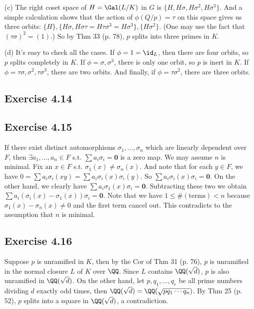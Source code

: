 \documentclass[../Chapter.tex]{subfiles}
\begin{document}
(c) The right coset space of $H=\Gal(L/K)$ in $G$ is $\{H,H\sigma,H\sigma^2,H\sigma^3\}$. And a simple calculation shows that the action of $\phi(Q/p)=\tau$ on this space gives us three orbits: $\{H\},\{H\sigma,H\sigma\tau=H\tau\sigma^3=H\sigma^3\},\{H\sigma^2\}$. (One may use the fact that $(\tau\sigma)^2=(1)$.) So by Thm 33 (p. 78), $p$ splits into three primes in $K$.

(d) It's easy to check all the cases. If $\phi=1=\id_L$, then there are four orbits, so $p$ splits completely in $K$. If $\phi=\sigma,\sigma^3$, there is only one orbit, so $p$ is inert in $K$. If $\phi=\tau\sigma,\sigma^2,\tau\sigma^3$, there are two orbits. And finally, if $\phi=\tau\sigma^2$, there are three orbits.

\subsection*{Exercise 4.14}

\subsection*{Exercise 4.15}

If there exist distinct automorphisms $\sigma_1,\ldots,\sigma_n$ which are linearly dependent over $F$, then $\exists a_1,\ldots,a_n\in F$ s.t. $\sum a_i\sigma_i=\mathbf{0}$ is a zero map. We may assume $n$ is minimal. Fix an $x\in F$ s.t. $\sigma_1(x)\neq\sigma_n(x)$. And note that for each $y\in F$, we have $0=\sum a_i\sigma_i(xy)=\sum a_i\sigma_i(x)\sigma_i(y)$. So $\sum a_i\sigma_i(x)\sigma_i=\mathbf{0}$. On the other hand, we clearly have $\sum a_i\sigma_1(x)\sigma_i=\mathbf{0}$. Subtracting these two we obtain $\sum a_i(\sigma_i(x)-\sigma_1(x))\sigma_i=\mathbf{0}$. Note that we have $1\leq\#(\text{terms})<n$ because $\sigma_1(x)-\sigma_n(x)\neq 0$ and the first term cancel out. This contradicts to the assumption that $n$ is minimal.

\subsection*{Exercise 4.16}

Suppose $p$ is unramified in $K$, then by the Cor of Thm 31 (p. 76), $p$ is unramified in the normal closure $L$ of $K$ over $\QQ$. Since $L$ contains $\QQ(\sqrt{d})$, $p$ is also unramified in $\QQ(\sqrt{d})$. On the other hand, let $p,q_1,\ldots,q_r$ be all prime numbers dividing $d$ exactly odd times, then $\QQ(\sqrt{d})=\QQ(\sqrt{pq_1\cdots q_n})$. By Thm 25 (p. 52), $p$ splits into a square in $\QQ(\sqrt{d})$, a contradiction.
\end{document}
